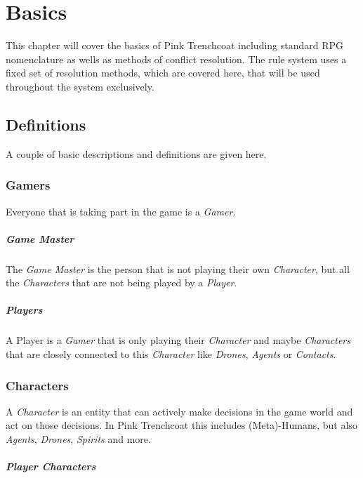\chapter{Basics}

This chapter will cover the basics of Pink Trenchcoat including standard RPG
nomenclature as wells as methods of conflict resolution. The rule system
uses a fixed set of resolution methods, which are covered here, that will be used
throughout the system exclusively.

\section{Definitions}

A couple of basic descriptions and definitions are given here.

\subsection{Gamers}

Everyone that is taking part in the game is a \emph{Gamer}.

\paragraph{Game Master}

The \emph{Game Master} is the person that is not playing their own \emph{Character},
but all the \emph{Characters} that are not being played by a \emph{Player}.

\paragraph{Players}
A Player is a \emph{Gamer} that is only playing their \emph{Character} and maybe
\emph{Characters} that are closely connected to this \emph{Character} like
\emph{Drones}, \emph{Agents} or \emph{Contacts}.

\subsection{Characters}

A \emph{Character} is an entity that can actively make decisions in the game world
and act on those decisions. In Pink Trenchcoat this includes (Meta)-Humans, but also
\emph{Agents}, \emph{Drones}, \emph{Spirits} and more.

\paragraph{Player Characters}

